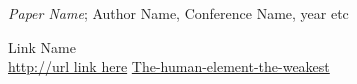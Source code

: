 \begin{thebibliography}{99}


\emph{Paper Name}; Author Name, Conference Name, year etc 

Link Name \\ \url{http://url link here}
\url{The-human-element-the-weakest}



\end{thebibliography}